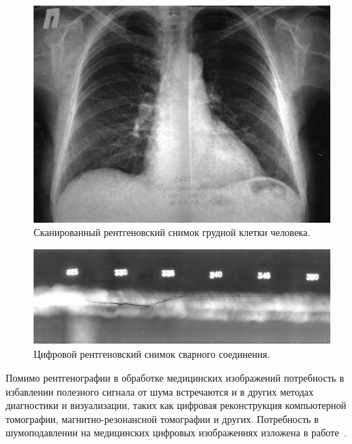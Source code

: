 \begin{figure}[h]
	\centering
	\includegraphics[width=\textwidth]{img/reng_scan}
	\caption{Сканированный рентгеновский снимок грудной клетки человека.}
	\label{fig:reng_scan}
\end{figure}

\begin{figure}[h]
	\centering
	\includegraphics[width=\textwidth]{img/reng_met_scan}
	\caption{Цифровой рентгеновский снимок сварного соединения.}
	\label{fig:reg_met_scan}
\end{figure}

Помимо рентгенографии в обработке медицинских изображений потребность в избавлении полезного сигнала от шума встречаются и в других методах диагностики и визуализации, таких как цифровая реконструкция компьютерной томографии, магнитно-резонансной томографии и других. Потребность в шумоподавлении на медицинских цифровых изображениях изложена в работе~\autocite{MedicalImagesProcessing}.

